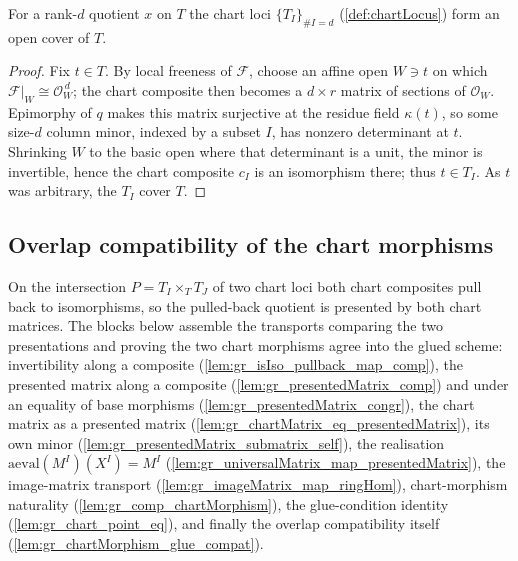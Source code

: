 \begin{lemma}
  \label{lem:chartLocus_isOpenCover}
  For a rank-\(d\) quotient \(x\) on \(T\) the chart loci \(\{T_I\}_{\#I = d}\)
  (\cref{def:chartLocus}) form an open cover of \(T\).
\end{lemma}
\begin{proof}
  \leanok
  Fix \(t \in T\). By local freeness of \(\mathcal{F}\), choose an affine open \(W \ni t\) on
  which \(\mathcal{F}|_W \cong \mathcal{O}_W^{\,d}\); the chart composite then becomes a
  \(d\times r\) matrix of sections of \(\mathcal{O}_W\). Epimorphy of \(q\) makes this matrix
  surjective at the residue field \(\kappa(t)\), so some size-\(d\) column minor, indexed by a
  subset \(I\), has nonzero determinant at \(t\). Shrinking \(W\) to the basic open where that
  determinant is a unit, the minor is invertible, hence the chart composite \(c_I\) is an
  isomorphism there; thus \(t \in T_I\). As \(t\) was arbitrary, the \(T_I\) cover \(T\).
\end{proof}


\subsection{Overlap compatibility of the chart morphisms}

On the intersection \(P = T_I \times_T T_J\) of two chart loci both chart composites pull
back to isomorphisms, so the pulled-back quotient is presented by both chart matrices. The
blocks below assemble the transports comparing the two presentations and proving the two
chart morphisms agree into the glued scheme: invertibility along a composite
(\cref{lem:gr_isIso_pullback_map_comp}), the presented matrix along a composite
(\cref{lem:gr_presentedMatrix_comp}) and under an equality of base morphisms
(\cref{lem:gr_presentedMatrix_congr}), the chart matrix as a presented matrix
(\cref{lem:gr_chartMatrix_eq_presentedMatrix}), its own minor
(\cref{lem:gr_presentedMatrix_submatrix_self}), the realisation
\(\mathrm{aeval}(M^I)(X^I) = M^I\) (\cref{lem:gr_universalMatrix_map_presentedMatrix}), the
image-matrix transport (\cref{lem:gr_imageMatrix_map_ringHom}), chart-morphism naturality
(\cref{lem:gr_comp_chartMorphism}), the glue-condition identity
(\cref{lem:gr_chart_point_eq}), and finally the overlap compatibility itself
(\cref{lem:gr_chartMorphism_glue_compat}).

